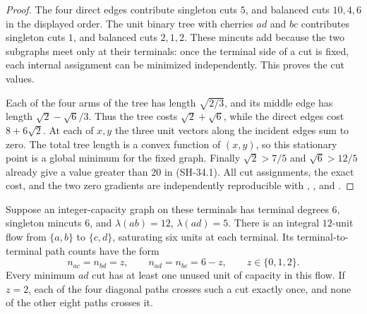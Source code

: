 \begin{proof}
The four direct edges contribute singleton cuts $5$, and
balanced cuts $10,4,6$ in the displayed order.  The unit
binary tree with cherries $ad$ and $bc$ contributes singleton
cuts $1$, and balanced cuts $2,1,2$.  These mincuts add because
the two subgraphs meet only at their terminals: once the
terminal side of a cut is fixed, each internal assignment
can be minimized independently.  This proves the cut values.

Each of the four arms of the tree has length $\sqrt{2/3}$,
and its middle edge has length $\sqrt2-\sqrt6/3$.  Thus the
tree costs $\sqrt2+\sqrt6$, while the direct edges cost
$8+6\sqrt2$.  At each of $x,y$ the three unit vectors along
the incident edges sum to zero.  The total tree length is a
convex function of $(x,y)$, so this stationary point is a
global minimum for the fixed graph.  Finally
$\sqrt2>7/5$ and $\sqrt6>12/5$ already give a value greater
than $20$ in (SH-34.1).  All cut assignments, the exact cost,
and the two zero gradients are independently reproducible
with ,
, and
.
\end{proof}

\begin{lemma}
\label{lem:critical-integral-flow}
Suppose an integer-capacity graph on these terminals has
terminal degrees $6$, singleton mincuts $6$, and
$\lambda(ab)=12$, $\lambda(ad)=5$.  There is an integral
$12$-unit flow from $\{a,b\}$ to $\{c,d\}$, saturating
six units at each terminal.  Its terminal-to-terminal path
counts have the form
\[
 n_{ac}=n_{bd}=z,\qquad n_{ad}=n_{bc}=6-z,
 \qquad z\in\{0,1,2\}.
                                                        \tag{SH-34.2}
\]
Every minimum $ad$ cut has at least one unused unit of
capacity in this flow.  If $z=2$, each of the four diagonal
paths crosses such a cut exactly once, and none of the
other eight paths crosses it.
\end{lemma}

